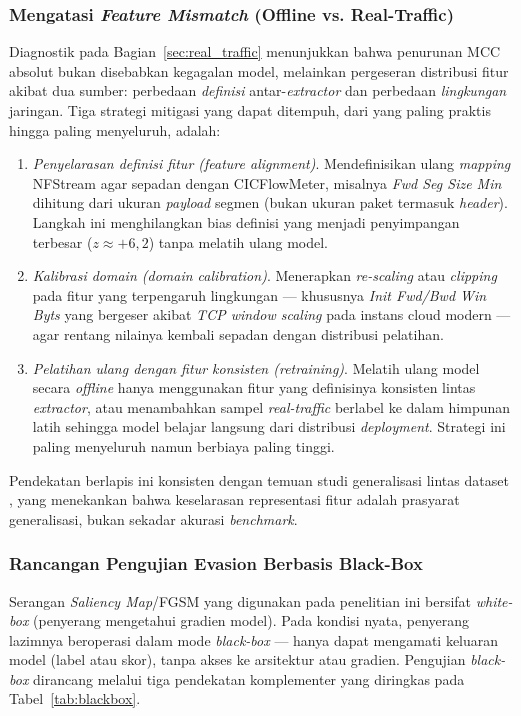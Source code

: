 \documentclass[10pt,twocolumn,a4paper]{extarticle}
\begin{document}
\subsubsection{Mengatasi \textit{Feature Mismatch} (Offline vs. Real-Traffic)}
Diagnostik pada Bagian~\ref{sec:real_traffic} menunjukkan bahwa penurunan MCC absolut bukan disebabkan kegagalan model, melainkan pergeseran distribusi fitur akibat dua sumber: perbedaan \textit{definisi} antar-\textit{extractor} dan perbedaan \textit{lingkungan} jaringan. Tiga strategi mitigasi yang dapat ditempuh, dari yang paling praktis hingga paling menyeluruh, adalah:
\begin{enumerate}[leftmargin=1.4cm]
    \item \textit{Penyelarasan definisi fitur (feature alignment)}. Mendefinisikan ulang \textit{mapping} NFStream agar sepadan dengan CICFlowMeter, misalnya \textit{Fwd Seg Size Min} dihitung dari ukuran \textit{payload} segmen (bukan ukuran paket termasuk \textit{header}). Langkah ini menghilangkan bias definisi yang menjadi penyimpangan terbesar ($z \approx +6{,}2$) tanpa melatih ulang model.
    \item \textit{Kalibrasi domain (domain calibration)}. Menerapkan \textit{re-scaling} atau \textit{clipping} pada fitur yang terpengaruh lingkungan --- khususnya \textit{Init Fwd/Bwd Win Byts} yang bergeser akibat \textit{TCP window scaling} pada instans cloud modern --- agar rentang nilainya kembali sepadan dengan distribusi pelatihan.
    \item \textit{Pelatihan ulang dengan fitur konsisten (retraining)}. Melatih ulang model secara \textit{offline} hanya menggunakan fitur yang definisinya konsisten lintas \textit{extractor}, atau menambahkan sampel \textit{real-traffic} berlabel ke dalam himpunan latih sehingga model belajar langsung dari distribusi \textit{deployment}. Strategi ini paling menyeluruh namun berbiaya paling tinggi.
\end{enumerate}
Pendekatan berlapis ini konsisten dengan temuan studi generalisasi lintas dataset \citep{ref_crossgen}, yang menekankan bahwa keselarasan representasi fitur adalah prasyarat generalisasi, bukan sekadar akurasi \textit{benchmark}.

\subsubsection{Rancangan Pengujian Evasion Berbasis Black-Box}
Serangan \textit{Saliency Map}/FGSM yang digunakan pada penelitian ini bersifat \textit{white-box} (penyerang mengetahui gradien model). Pada kondisi nyata, penyerang lazimnya beroperasi dalam mode \textit{black-box} --- hanya dapat mengamati keluaran model (label atau skor), tanpa akses ke arsitektur atau gradien. Pengujian \textit{black-box} dirancang melalui tiga pendekatan komplementer yang diringkas pada Tabel~\ref{tab:blackbox}.
\end{document}
